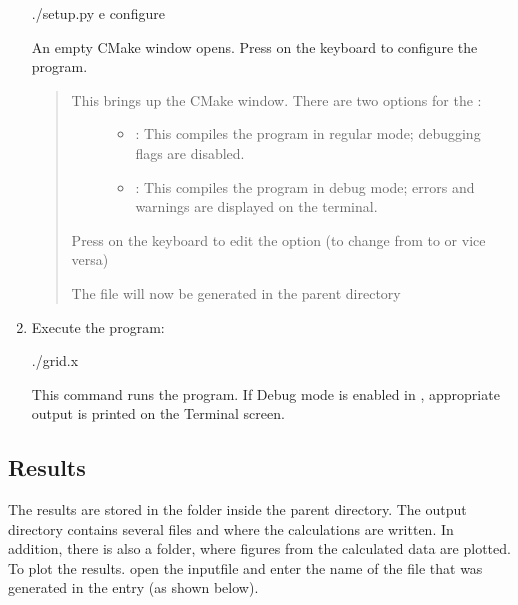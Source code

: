 \documentclass[letterpaper,10pt,english]{sphinxmanual}
\begin{document}
\begin{enumerate}
\begin{sphinxVerbatim}[commandchars=\\\{\}]
\PYGZdl{} ./setup.py \PYGZhy{}e configure
\end{sphinxVerbatim}

An empty CMake window opens. Press \sphinxcode{{[}c{]}} on the keyboard to configure the program.
\begin{quote}
\begin{description}
\item[{This brings up the CMake window. There are two options for the  :}] \leavevmode\begin{itemize}
\item {} 
: This compiles the program in regular mode; debugging flags are disabled.

\item {} 
:   This compiles the program in debug mode; errors and warnings are displayed on the terminal.

\end{itemize}

\end{description}

Press \sphinxcode{{[}Enter{]}} on the keyboard to edit the option (to change from  to  or vice versa)

The file  will now be generated in the parent directory
\end{quote}

\item {} 
Execute the program:

\begin{sphinxVerbatim}[commandchars=\\\{\}]
\PYGZdl{} ./grid.x
\end{sphinxVerbatim}

This command runs the program. If Debug mode is enabled in , appropriate output is printed on the Terminal screen.

\end{enumerate}


\subsection{Results}
\label{\detokenize{setup:results}}\label{\detokenize{setup:id3}}
The results are stored in the  folder inside the parent directory. The output directory contains several files  and  where the calculations are written. In addition, there is also a  folder, where figures from the calculated data are plotted. To plot the results. open the inputfile and enter the name of the  file that was generated in the  entry (as shown below).
\end{document}
